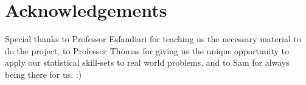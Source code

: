 \documentclass[12pt,letterpaper]{article}
\begin{document}
\section{Acknowledgements}

Special thanks to Professor Esfandiari for teaching us the necessary material to do the project, to Professor Thomas for giving us the unique opportunity to apply our statistical skill-sets to real world problems, and to Sam for always being there for us. :)


\pagebreak


 
\end{document}
